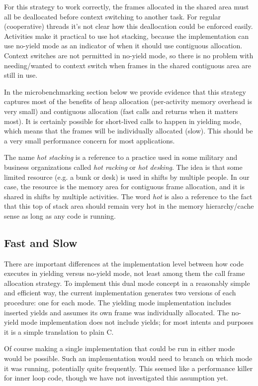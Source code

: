 \documentclass[10pt,preprint]{sigplanconf}
\begin{document}
For this strategy to work correctly, the frames allocated in the shared area must all be deallocated before context switching to another task.
For regular (cooperative) threads it's not clear how this deallocation could be enforced easily.
Activities make it practical to use hot stacking, because the implementation can use no-yield mode as an indicator of when it should use contiguous allocation.
Context switches are not permitted in no-yield mode, so there is no problem with needing/wanted to context switch when frames in the shared contiguous area are still in use.

In the microbenchmarking section below we provide evidence that this strategy captures most of the benefits of heap allocation (per-activity memory overhead is very small) and contiguous allocation (fast calls and returns when it matters most).
It is certainly possible for short-lived calls to happen in yielding mode, which means that the frames will be individually allocated (slow).
This should be a very small performance concern for most applications.

The name \emph{hot stacking} is a reference to a practice used in some military and business organizations called \emph{hot racking} or \emph{hot desking}.
The idea is that some limited resource (e.g. a bunk or desk) is used in shifts by multiple people.
In our case, the resource is the memory area for contiguous frame allocation, and it is shared in shifts by multiple activities.
The word \emph{hot} is also a reference to the fact that this top of stack area should remain very hot in the memory hierarchy/cache sense as long as any code is running.

\subsection{Fast and Slow}

There are important differences at the implementation level between how code executes in yielding versus no-yield mode, not least among them the call frame allocation strategy.
To implement this dual mode concept in a reasonably simple and efficient way, the current \charcoal{} implementation generates two versions of each procedure: one for each mode.
The yielding mode implementation includes inserted yields and assumes its own frame was individually allocated.
The no-yield mode implementation does not include yields; for most intents and purposes it is a simple translation to plain C.

Of course making a single implementation that could be run in either mode would be possible.
Such an implementation would need to branch on which mode it was running, potentially quite frequently.
This seemed like a performance killer for inner loop code, though we have not investigated this assumption yet.
\end{document}
